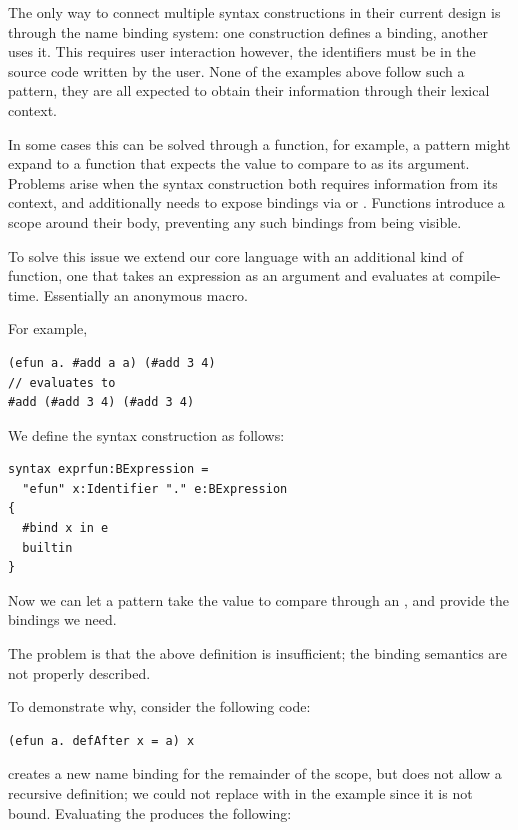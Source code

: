 \documentclass{kththesis}
\begin{document}
The only way to connect multiple syntax constructions in their current design is through the name binding system: one construction defines a binding, another uses it. This requires user interaction however, the identifiers must be in the source code written by the user. None of the examples above follow such a pattern, they are all expected to obtain their information through their lexical context.

In some cases this can be solved through a function, for example, a pattern might expand to a function that expects the value to compare to as its argument. Problems arise when the syntax construction both requires information from its context, and additionally needs to expose bindings via  or . Functions introduce a scope around their body, preventing any such bindings from being visible.

To solve this issue we extend our core language with an additional kind of function, one that takes an expression as an argument and evaluates at compile-time. Essentially an anonymous macro.

For example,

\begin{verbatim}
(efun a. #add a a) (#add 3 4)
// evaluates to
#add (#add 3 4) (#add 3 4)
\end{verbatim}

We define the syntax construction as follows:

\begin{verbatim}
syntax exprfun:BExpression =
  "efun" x:Identifier "." e:BExpression
{
  #bind x in e
  builtin
}
\end{verbatim}

Now we can let a pattern take the value to compare through an , and provide the bindings we need.

The problem is that the above definition is insufficient; the binding semantics are not properly described.

To demonstrate why, consider the following code:

\begin{verbatim}
(efun a. defAfter x = a) x
\end{verbatim}

 creates a new name binding for the remainder of the scope, but does not allow a recursive definition; we could not replace  with  in the example since it is not bound. Evaluating the  produces the following:
\end{document}
